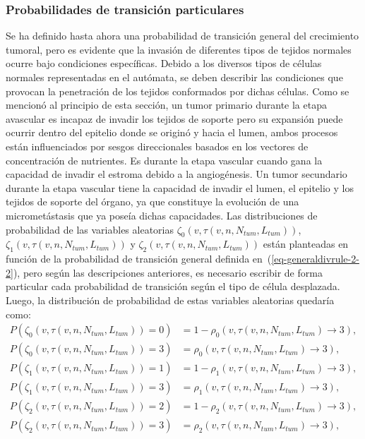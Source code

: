 \subsubsection{Probabilidades de transici\'on particulares}
Se ha definido hasta ahora una probabilidad de transición general del crecimiento tumoral, pero es evidente que la invasión de diferentes tipos de tejidos normales ocurre bajo condiciones específicas. Debido a los diversos tipos de células normales representadas en el autómata, se deben describir las condiciones que provocan la penetración de los tejidos conformados por dichas células. Como se mencionó al principio de esta sección, un tumor primario durante la etapa avascular es incapaz de invadir los tejidos de soporte pero su expansión puede ocurrir dentro del epitelio donde se originó y hacia el lumen, ambos procesos están influenciados por sesgos direccionales basados en los vectores de concentración de nutrientes. Es durante la etapa vascular cuando gana la capacidad de invadir el estroma debido a la angiogénesis. Un tumor secundario durante la etapa vascular tiene la capacidad de invadir el lumen, el epitelio y los tejidos de soporte del órgano, ya que constituye la evolución de una micrometástasis que ya poseía dichas capacidades. Las distribuciones de probabilidad de las variables aleatorias $\zeta_0(v,\tau(v,n,N_{tum},L_{tum}))$, $\zeta_1(v,\tau(v,n,N_{tum},L_{tum}))$ y $\zeta_2(v,\tau(v,n,N_{tum},L_{tum}))$ están planteadas en función de la probabilidad de transición general definida en~(\ref{eq-generaldivrule-2-2}), pero según las descripciones anteriores, es necesario escribir de forma particular cada probabilidad de transición según el tipo de célula desplazada. Luego, la distribución de probabilidad de estas variables aleatorias quedaría como:
\begin{subequations}
\begin{align}
P(\zeta_0(v,\tau(v,n,N_{tum},L_{tum}))=0) &= 1 - \rho_0(v,\tau(v,n,N_{tum},L_{tum}) \rightarrow 3),\\
P(\zeta_0(v,\tau(v,n,N_{tum},L_{tum}))=3) &= \rho_0(v,\tau(v,n,N_{tum},L_{tum}) \rightarrow 3),\\
P(\zeta_1(v,\tau(v,n,N_{tum},L_{tum}))=1) &= 1 - \rho_1(v,\tau(v,n,N_{tum},L_{tum}) \rightarrow 3),\\
P(\zeta_1(v,\tau(v,n,N_{tum},L_{tum}))=3) &= \rho_1(v,\tau(v,n,N_{tum},L_{tum}) \rightarrow 3),\\
P(\zeta_2(v,\tau(v,n,N_{tum},L_{tum}))=2) &= 1 - \rho_2(v,\tau(v,n,N_{tum},L_{tum}) \rightarrow 3),\\
P(\zeta_2(v,\tau(v,n,N_{tum},L_{tum}))=3) &= \rho_2(v,\tau(v,n,N_{tum},L_{tum}) \rightarrow 3),
\end{align}
\end{subequations}
